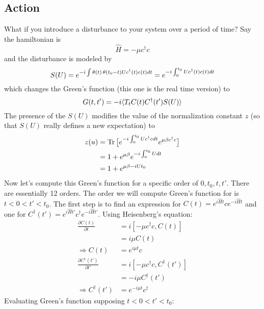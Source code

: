 \documentclass{article}
\begin{document}
\subsection{Action}
What if you introduce a disturbance to your system over a period of time? Say the hamiltonian is \begin{equation*} \hat{H} = -\mu c^\dagger c \end{equation*} and the disturbance is modeled by 
\begin{equation*} S(U) = e^{-i \int \operatorname{\theta}(t)\operatorname{\theta}(t_0 - t) U c^\dagger(t) c(t) dt} = e^{-i \int_0^{t_0}U c^\dagger (t) c(t) dt} \end{equation*} 
which changes the Green's function (this one is the real time version) to 
\begin{equation*}G(t, t') = -i\langle T_t C(t)C^\dagger(t') S(U) \rangle \end{equation*}
The presence of the $S(U)$ modifies the value of the normalization constant $z$ (so that $S(U)$ really defines a new expectation) to 
\begin{align*}
z(u) &= \operatorname{Tr} \big[ e^{-i\int_0^{t_0} Uc^\dagger c dt} e^{\mu\beta c^\dagger c} \big] \\
&= 1 + e^{\mu\beta} e^{-i\int_0^{t_0} U dt} \\
&= 1 + e^{\mu\beta - iUt_0}
\end{align*}
Now let's compute this Green's function for a specific order of $0, t_0, t, t'$. There are essentially 12 orders. The order we will compute Green's function for is $t < 0 < t' < t_0$. The first step is to find an expression for $C(t) = e^{i\hat{H}t}c e^{-i\hat{H}t}$ and one for $C^\dagger(t') = e^{i\hat{H}t'}c^\dagger e^{-i\hat{H}t'}$. Using Heisenberg's equation:
\begin{align*}
\frac{\partial C(t)}{\partial t} &= i[-\mu c^\dagger c, C(t)] \\
&= i \mu C(t) \\
\Rightarrow C(t) &= e^{i\mu t} c \\
\frac{\partial C^\dagger(t')}{\partial t'} &= i[-\mu c^\dagger c, C^\dagger(t')] \\
&= -i \mu C^\dagger(t') \\
\Rightarrow C^\dagger(t') &= e^{-i\mu t} c^\dagger
\end{align*}
Evaluating Green's function supposing $t < 0 < t' < t_0$:
\end{document}
